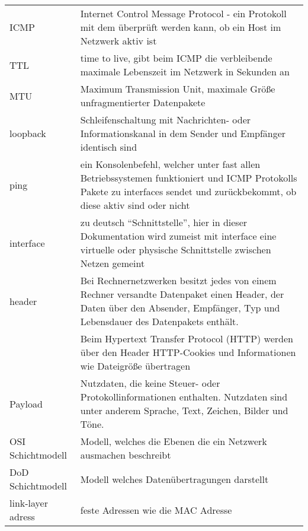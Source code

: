\renewcommand*{\arraystretch}{1.4}
\begin{longtable}{p{}p{}}
    ICMP & Internet Control Message Protocol - ein Protokoll mit dem überprüft werden kann, ob ein Host im Netzwerk aktiv ist
    \\
    TTL & time to live, gibt beim ICMP die verbleibende maximale Lebenszeit im Netzwerk in Sekunden an
    \\
    MTU & Maximum Transmission Unit, maximale Größe unfragmentierter Datenpakete
    \\
    loopback & Schleifenschaltung mit Nachrichten- oder Informationskanal in dem Sender und Empfänger identisch sind
    \\
    ping & ein Konsolenbefehl, welcher unter fast allen Betriebssystemen funktioniert und ICMP Protokolls Pakete zu interfaces sendet und zurückbekommt, ob diese aktiv sind oder nicht
    \\
    interface &  zu deutsch “Schnittstelle”, hier in dieser Dokumentation wird zumeist mit interface eine virtuelle oder physische Schnittstelle zwischen Netzen gemeint
    \\
    header & Bei Rechnernetzwerken besitzt jedes von einem Rechner versandte Datenpaket einen Header, der Daten über den Absender, Empfänger, Typ und Lebensdauer des Datenpakets enthält.
    \\
    & Beim Hypertext Transfer Protocol (HTTP) werden über den Header HTTP-Cookies und Informationen wie Dateigröße übertragen
    \\
    Payload & Nutzdaten, die keine Steuer- oder Protokollinformationen enthalten. Nutzdaten sind unter anderem Sprache, Text, Zeichen, Bilder und Töne.
    \\
    OSI Schichtmodell & Modell, welches die Ebenen die ein Netzwerk ausmachen beschreibt
    \\
    DoD Schichtmodell & Modell welches Datenübertragungen darstellt
    \\
    link-layer adress & feste Adressen wie die MAC Adresse
\end{longtable}